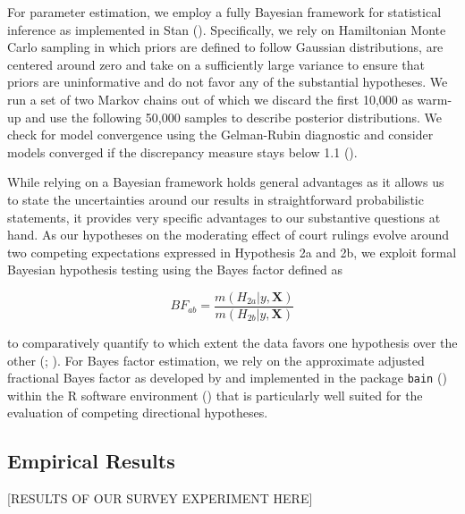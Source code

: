 \documentclass[11pt, ngerman,english,a4]{article}
\begin{document}
For parameter estimation, we employ a fully Bayesian framework for statistical inference as implemented in Stan (\citealt{StanDevelopmentTeam2020}). Specifically, we rely on Hamiltonian Monte Carlo sampling in which priors are defined to follow Gaussian distributions, are centered around zero and take on a sufficiently large variance to ensure that priors are uninformative and do not favor any of the substantial hypotheses. We run a set of two Markov chains out of which we discard the first 10,000 as warm-up and use the following 50,000 samples to describe posterior distributions. We check for model convergence using the Gelman-Rubin diagnostic and consider models converged if the discrepancy measure stays below 1.1 (\citealt{Gelman2004}).

While relying on a Bayesian framework holds general advantages as it allows us to state the uncertainties around our results in straightforward probabilistic statements, it provides very specific advantages to our substantive questions at hand. As our hypotheses on the moderating effect of court rulings evolve around two competing expectations expressed in Hypothesis 2a and 2b, we exploit formal Bayesian hypothesis testing using the Bayes factor defined as 

\begin{equation}
    BF_{ab} = \frac{m(H_{2a}|y,\bm{X})}{m(H_{2b}|y,\bm{X})}
\end{equation}

\noindent to comparatively quantify to which extent the data favors one hypothesis over the other (\citealt{Kass1995}; \citealt{Gill2015}). For Bayes factor estimation, we rely on the approximate adjusted fractional Bayes factor as developed by \citet{Gu2018} and implemented in the package \texttt{bain} (\citealt{bain2020}) within the R software environment (\citealt{R2020}) that is particularly well suited for the evaluation of competing directional hypotheses. 

\subsection*{Empirical Results}

\vspace{1cm}

\begin{center}
    [RESULTS OF OUR SURVEY EXPERIMENT HERE]
\end{center}

\vspace{1cm}
\end{document}
